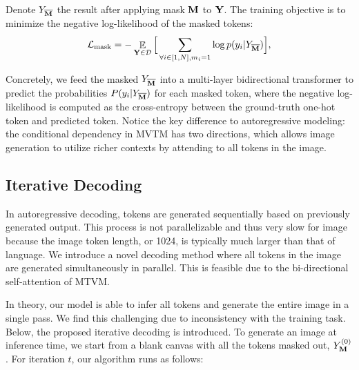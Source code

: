 Denote $Y_{{\overline{\mathbf{M}}}}$ the result after applying mask ${\mathbf{M}}$ to ${\mathbf{Y}}$.
The training objective is to minimize the negative log-likelihood of the masked tokens:
\begin{equation}
\label{eq:loss}
\mathcal{L}_{\text{mask}} = - \mathop{\mathbb{E}} \limits_{{\mathbf{Y}}  \in \mathcal{D}} \Big[ \sum_{\forall i \in [1,N], m_i=1} \log p(y_i| Y_{{\overline{\mathbf{M}}}}) \Big],
\end{equation}

\noindent Concretely, we feed the masked $Y_{{\overline{\mathbf{M}}}}$ into a multi-layer bidirectional transformer to predict the probabilities $P(y_i | Y_{{\overline{\mathbf{M}}}} )$ for each masked token, where the negative log-likelihood is computed as the cross-entropy between the ground-truth one-hot token and predicted token.
Notice the key difference to autoregressive modeling: the conditional dependency in MVTM has two directions, which allows image generation to utilize richer contexts by attending to all tokens in the image.

\subsection{Iterative Decoding}
\label{ssec:decoding}
In autoregressive decoding, tokens are generated sequentially based on previously generated output. This process is not parallelizable and thus very slow for image because the image token length,  or 1024, is typically much larger than that of language. We introduce a novel decoding method where all tokens in the image are generated simultaneously in parallel. This is feasible due to the bi-directional self-attention of MTVM. 

In theory, our model is able to infer all tokens and generate the entire image in a single pass. We find this challenging due to inconsistency with the training task. Below, the proposed iterative decoding is introduced.
To generate an image at inference time, we start from a blank canvas with all the tokens masked out, \ie $Y_{\mathbf{M}}^{(0)}$. For iteration $t$, our algorithm runs as follows: 
 
